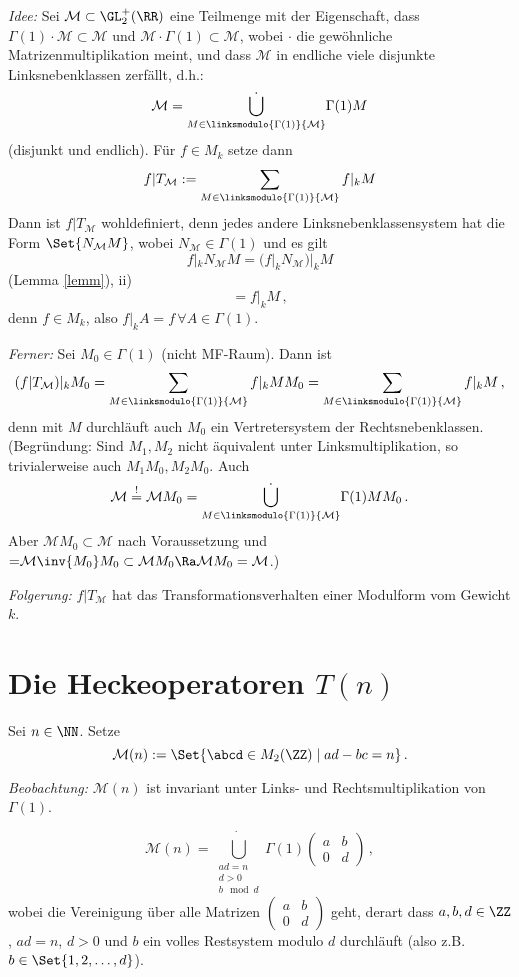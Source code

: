 \emph{Idee:} Sei $\mathcal{M} \subset \GL_2^+(\RR)$ eine Teilmenge mit der Eigenschaft, dass $\Gamma (1) \cdot \mathcal M \subset \mathcal M$ und $\mathcal M \cdot \Gamma(1) \subset \mathcal M$, wobei $\cdot$ die gewöhnliche Matrizenmultiplikation meint, und dass $\mathcal M$ in endliche viele disjunkte Linksnebenklassen zerfällt, d.h.:
\[
\mathcal M = \dot{\bigcup_{M \in \linksmodulo{\Gamma(1)}{\mathcal M}}} \Gamma(1) M
\]
(disjunkt und endlich). Für $f \in M_k$ setze dann
\[
f | T_{\mathcal M} := \sum_{M \in \linksmodulo{\Gamma(1)}{\mathcal M}} f|_k M
\]
Dann ist $f | T_{\mathcal M}$ wohldefiniert, denn jedes andere Linksnebenklassensystem hat die Form $\Set{N_{\mathcal M} M}$, wobei $N_{\mathcal M} \in \Gamma(1)$ und es gilt 
\[
f |_k N_{\mathcal M} M = (f |_k N_{\mathcal M}) |_k M
\]
(Lemma \ref{lemm}), ii)
\[
= f |_k M
\,,
\]
denn $f \in M_k$, also $f |_k A = f \, \forall A \in \Gamma(1)$.

\emph{Ferner:} Sei $M_0 \in \Gamma(1)$ (nicht MF-Raum). Dann ist 
\[
(f | T_{\mathcal M}) |_k M_0 = \sum_{M \in \linksmodulo{\Gamma(1)}{\mathcal M}} f |_k M M_0 = \sum_{M \in \linksmodulo{\Gamma(1)}{\mathcal M}} f |_k M
\,,
\]
denn mit $M$ durchläuft auch $M_0$ ein Vertretersystem der Rechtsnebenklassen. (Begründung: Sind $M_1, M_2$ nicht äquivalent unter Linksmultiplikation, so trivialerweise auch $M_1M_0, M_2M_0$. Auch 
\[
\mathcal M \overset != \mathcal M M_0 = \dot{\bigcup_{M \in \linksmodulo{\Gamma(1)}{\mathcal M}}} \Gamma(1) M M_0
\,.
\]
Aber $\mathcal M M_0 \subset \mathcal M$ nach Voraussetzung und $\mathcal = \mathcal M \inv{M_0}M_0 \subset \mathcal M M_0 \Ra \mathcal M M_0 = \mathcal M$.)

\emph{Folgerung:} $f | T_{\mathcal M}$ hat das Transformationsverhalten einer Modulform vom Gewicht $k$.

\section{Die Heckeoperatoren $T(n)$}

\begin{defi}
Sei $n \in \NN$. Setze 
\[
\mathcal M(n) := \Set{ \abcd \in M_2(\ZZ) \mid ad - bc = n }
\,.
\]
\end{defi}

\emph{Beobachtung:} $\mathcal M(n)$ ist invariant unter Links- und Rechtsmultiplikation von $\Gamma (1)$. 

\begin{lemm}
\[
\mathcal M (n) = \dot{\bigcup_{\substack{ad = n\\ d > 0\\
b \mod d}}} \Gamma(1) \begin{pmatrix}a&b\\0&d\end{pmatrix}
\,,
\]
wobei die Vereinigung über alle Matrizen $\begin{pmatrix}a&b\\0&d\end{pmatrix}$ geht, derart dass $a,b,d \in \ZZ$, $ad = n$, $d > 0$ und $b$ ein volles Restsystem modulo $d$ durchläuft (also z.B. $b \in \Set{1, 2, \ldots, d}$).
\end{lemm}

